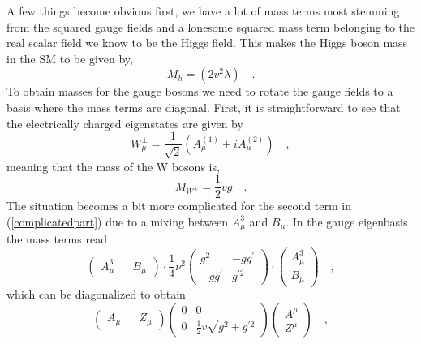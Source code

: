 A few things become obvious first, we have a lot of mass terms most stemming from the squared gauge fields and a lonesome squared mass term belonging to the real scalar field we know to be the Higgs field. This makes the Higgs boson mass in the SM to be given by,
%
\begin{equation}
M_h= (2v^2 \lambda) \quad .  
\end{equation}
%
To obtain masses for the gauge bosons we need to rotate the gauge fields to a basis where the mass terms are diagonal. First, it is straightforward to see that the electrically charged eigenstates are given by %
\begin{equation}
W^\pm_\mu = \frac{1}{\sqrt{2}} (A^{(1)}_\mu \pm i A^{(2)}_\mu) \quad , 
\label{gagestate}
\end{equation}
meaning that the mass of the W bosons is, 
\begin{equation}
M_{W^\pm}= \frac{1}{2} v g \quad .
\end{equation}
The situation becomes a bit more complicated for the second term in (\ref{complicatedpart}) due to a mixing between $A_\mu^3$ and $B_\mu$. In the gauge eigenbasis the mass terms read
\begin{equation}
\begin{pmatrix}
A_\mu^3 && B_\mu
\end{pmatrix} \cdot  \frac{1}{4} \nu ^2 \begin{pmatrix}
g^2  & -g g^\prime \\
-g g^\prime & g^{\prime 2} 
\end{pmatrix} \cdot \begin{pmatrix}
A_\mu^3 \\  B_\mu
\end{pmatrix}  \quad , 
\end{equation} 
which can be diagonalized to obtain
\begin{equation}
\begin{pmatrix}
A_\mu && Z_\mu 
\end{pmatrix} \begin{pmatrix}
0  & 0 \\
0  & \frac{1}{2} v \sqrt{g^2 + g^{\prime 2}} 
\end{pmatrix}  \begin{pmatrix}
A^\mu \\ Z^\mu
\end{pmatrix}  \quad , 
\end{equation}
